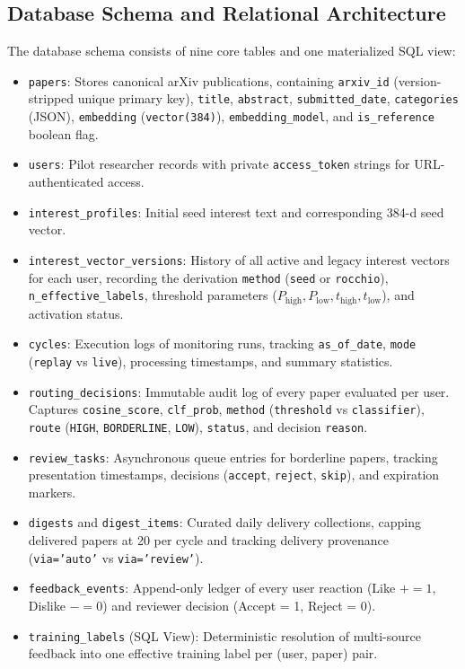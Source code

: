 \subsection{Database Schema and Relational Architecture}
\label{sec:schema}

The database schema consists of nine core tables and one materialized SQL view:
\begin{itemize}
    \item \texttt{papers}: Stores canonical arXiv publications, containing \texttt{arxiv\_id} (version-stripped unique primary key), \texttt{title}, \texttt{abstract}, \texttt{submitted\_date}, \texttt{categories} (JSON), \texttt{embedding} (\texttt{vector(384)}), \texttt{embedding\_model}, and \texttt{is\_reference} boolean flag.
    \item \texttt{users}: Pilot researcher records with private \texttt{access\_token} strings for URL-authenticated access.
    \item \texttt{interest\_profiles}: Initial seed interest text and corresponding 384-d seed vector.
    \item \texttt{interest\_vector\_versions}: History of all active and legacy interest vectors for each user, recording the derivation \texttt{method} (\texttt{seed} or \texttt{rocchio}), \texttt{n\_effective\_labels}, threshold parameters ($P_{\text{high}}, P_{\text{low}}, t_{\text{high}}, t_{\text{low}}$), and activation status.
    \item \texttt{cycles}: Execution logs of monitoring runs, tracking \texttt{as\_of\_date}, \texttt{mode} (\texttt{replay} vs \texttt{live}), processing timestamps, and summary statistics.
    \item \texttt{routing\_decisions}: Immutable audit log of every paper evaluated per user. Captures \texttt{cosine\_score}, \texttt{clf\_prob}, \texttt{method} (\texttt{threshold} vs \texttt{classifier}), \texttt{route} (\texttt{HIGH}, \texttt{BORDERLINE}, \texttt{LOW}), \texttt{status}, and decision \texttt{reason}.
    \item \texttt{review\_tasks}: Asynchronous queue entries for borderline papers, tracking presentation timestamps, decisions (\texttt{accept}, \texttt{reject}, \texttt{skip}), and expiration markers.
    \item \texttt{digests} and \texttt{digest\_items}: Curated daily delivery collections, capping delivered papers at 20 per cycle and tracking delivery provenance (\texttt{via='auto'} vs \texttt{via='review'}).
    \item \texttt{feedback\_events}: Append-only ledger of every user reaction (Like $\pmb{+} = 1$, Dislike $\pmb{-} = 0$) and reviewer decision (Accept = 1, Reject = 0).
    \item \texttt{training\_labels} (SQL View): Deterministic resolution of multi-source feedback into one effective training label per (user, paper) pair.
\end{itemize}
